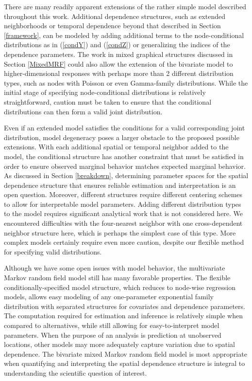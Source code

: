 \documentclass[12pt, a4paper, twoside]{article}
\begin{document}
There are many readily apparent extensions of the rather simple model described throughout this work. Additional dependence structures, such as extended neighborhoods or temporal dependence beyond that described in Section \ref{framework}, can be modeled by adding additional terms to the node-conditional distributions as in (\ref{condY}) and (\ref{condZ}) or generalizing the indices of the dependence parameters. The work in mixed graphical structures discussed in Section \ref{MixedMRF} could also allow the extension of the bivariate model to higher-dimensional responses with perhaps more than 2 different distribution types, such as nodes with Poisson or even Gamma-family distributions. While the initial stage of specifying node-conditional distributions is relatively straightforward, caution must be taken to ensure that the conditional distributions can then form a valid joint distribution.

Even if an extended model satisfies the conditions for a valid corresponding joint distribution, model degeneracy poses a larger obstacle to the proposed possible extensions. With each additional spatial or temporal neighbor added to the model, the conditional structure has another constraint that must be satisfied in order to ensure observed marginal behavior matches expected marginal behavior. As discussed in Section \ref{breakdown}, determining parameter spaces for the spatial dependence structure that ensures reliable estimation and interpretation is an open question. Moreover, different structures require different centering schemes to allow for interpretable model parameters. Adding different distribution types to the model requires significant analytical work that is not considered here.  We encountered difficulties with the four-nearest neighbor with one cross-dependent neighbor structure here, which is perhaps the simplest case of this type. More complex models certainly require even more caution, despite our flexible method for specifying valid distributions.

Although we have some open issues with model behavior, the multivariate Markov random field model still has many favorable properties. The flexible conditionally-specified model structure, which reduces to node-wise regression models, allows easy modeling of any one-parameter exponential family distribution with separated structures for covariates and dependence parameters. The computation required for estimation and inference is relatively simple when compared to alternatives, while still allowing for easy-to-interpret model parameters. When the purpose of an analysis is prediction at unobserved locations, other models may more adequately capture variation due to spatial dependence. The bivariate mixed Markov random field model is most appropriate when quantifying and interpreting the spatial dependence structure is integral to understanding the scientific question of interest.
\end{document}
